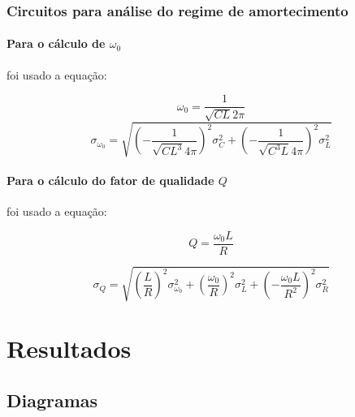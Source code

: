 \documentclass[a4paper]{article}
\begin{document}
\subsubsection{Circuitos para análise do regime de amortecimento}

\paragraph{Para o cálculo de $\omega_0$} foi usado a equação:

$$
	\omega_0 = \frac{1}{\sqrt{C L} 2 \pi}
$$
$$
	\sigma_{\omega_0} =
    \sqrt{
    	\left( -\frac{1}{\sqrt{C L^3} 4\pi} \right)^2 \sigma_C^2 +
    	\left( -\frac{1}{\sqrt{C^3 L} 4\pi} \right)^2 \sigma_L^2
    }
$$

\paragraph{Para o cálculo do fator de qualidade $Q$} foi usado a equação:

$$
	Q = \frac{\omega_0 L}{R}
$$

$$
	\sigma_Q =
    \sqrt{
    	\left( \frac{L}{R} \right)^2 \sigma_{\omega_0}^2 +
    	\left( \frac{\omega_0}{R} \right)^2 \sigma_{L}^2 +
    	\left( -\frac{\omega_0 L}{R^2} \right)^2 \sigma_{R}^2
    }
$$

\section{Resultados} 

\subsection{Diagramas}
\end{document}
